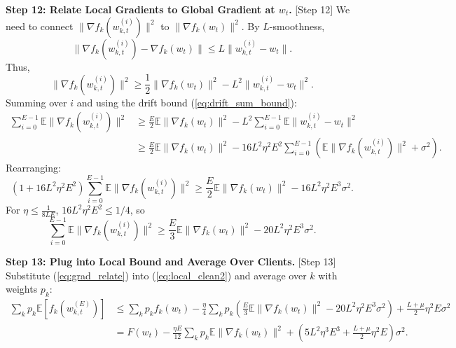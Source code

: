 \documentclass{article}
\begin{document}
\textbf{Step 12: Relate Local Gradients to Global Gradient at $w_t$.} [Step 12] %
We need to connect $\| \nabla f_k(w_{k,t}^{(i)}) \|^2$ to $\| \nabla f_k(w_t) \|^2$. By $L$-smoothness,
\begin{equation}
    \| \nabla f_k(w_{k,t}^{(i)}) - \nabla f_k(w_t) \| \leq L \| w_{k,t}^{(i)} - w_t \|.
\end{equation}
Thus,
\begin{equation}
    \| \nabla f_k(w_{k,t}^{(i)}) \|^2 \geq \frac{1}{2} \| \nabla f_k(w_t) \|^2 - L^2 \| w_{k,t}^{(i)} - w_t \|^2.
\end{equation}
Summing over $i$ and using the drift bound (\ref{eq:drift_sum_bound}):
\begin{align}
    \sum_{i=0}^{E-1} \mathbb{E} \| \nabla f_k(w_{k,t}^{(i)}) \|^2 &\geq \frac{E}{2} \mathbb{E} \| \nabla f_k(w_t) \|^2 - L^2 \sum_{i=0}^{E-1} \mathbb{E} \| w_{k,t}^{(i)} - w_t \|^2 \\
    &\geq \frac{E}{2} \mathbb{E} \| \nabla f_k(w_t) \|^2 - 16 L^2 \eta^2 E^2 \sum_{i=0}^{E-1} \left( \mathbb{E} \| \nabla f_k(w_{k,t}^{(i)}) \|^2 + \sigma^2 \right).
\end{align}
Rearranging:
\begin{equation}
    \left(1 + 16 L^2 \eta^2 E^2\right) \sum_{i=0}^{E-1} \mathbb{E} \| \nabla f_k(w_{k,t}^{(i)}) \|^2 \geq \frac{E}{2} \mathbb{E} \| \nabla f_k(w_t) \|^2 - 16 L^2 \eta^2 E^3 \sigma^2.
\end{equation}
For $\eta \leq \frac{1}{8 L E}$, $16 L^2 \eta^2 E^2 \leq 1/4$, so
\begin{equation}
    \sum_{i=0}^{E-1} \mathbb{E} \| \nabla f_k(w_{k,t}^{(i)}) \|^2 \geq \frac{E}{3} \mathbb{E} \| \nabla f_k(w_t) \|^2 - 20 L^2 \eta^2 E^3 \sigma^2. \label{eq:grad_relate}
\end{equation}

\textbf{Step 13: Plug into Local Bound and Average Over Clients.} [Step 13]
Substitute (\ref{eq:grad_relate}) into (\ref{eq:local_clean2}) and average over $k$ with weights $p_k$:
\begin{align}
    \sum_k p_k \mathbb{E}[f_k(w_{k,t}^{(E)})] &\leq \sum_k p_k f_k(w_t) - \frac{\eta}{4} \sum_k p_k \left( \frac{E}{3} \mathbb{E} \| \nabla f_k(w_t) \|^2 - 20 L^2 \eta^2 E^3 \sigma^2 \right) + \frac{L+\mu}{2} \eta^2 E \sigma^2 \\
    &= F(w_t) - \frac{\eta E}{12} \sum_k p_k \mathbb{E} \| \nabla f_k(w_t) \|^2 + \left( 5 L^2 \eta^3 E^3 + \frac{L+\mu}{2} \eta^2 E \right) \sigma^2. \label{eq:avg_local}
\end{align}
\end{document}
